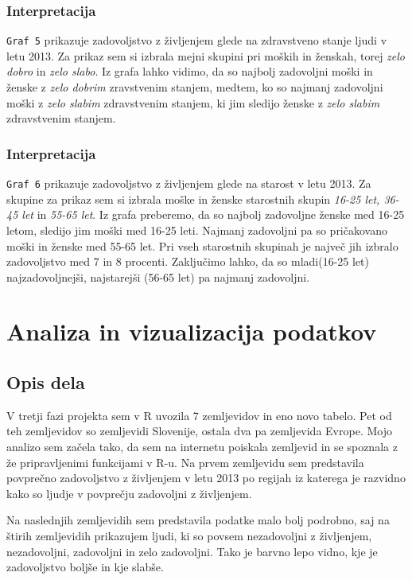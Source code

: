 \documentclass[11pt,a4paper]{article}
\begin{document}
\subsubsection{Interpretacija}
\verb+Graf 5+ prikazuje zadovoljstvo z življenjem glede na zdravstveno stanje ljudi v letu 2013. Za prikaz sem si izbrala mejni skupini pri moških in ženskah, torej \textit{zelo dobro} in \textit{zelo slabo}.  Iz grafa lahko vidimo, da so najbolj zadovoljni moški in ženske z \textit{zelo dobrim} zravstvenim stanjem, medtem, ko so najmanj zadovoljni moški z \textit{zelo slabim} zdravstvenim stanjem, ki jim sledijo ženske z \textit{zelo slabim} zdravstvenim stanjem.
\subsubsection{Interpretacija}
\verb+Graf 6+ prikazuje zadovoljstvo z življenjem glede na starost v letu 2013. Za skupine za prikaz sem si izbrala moške in ženske starostnih skupin \textit{16-25 let, 36-45 let} in \textit{55-65 let}. Iz grafa preberemo, da so najbolj zadovoljne ženske med 16-25 letom, sledijo jim moški med 16-25 leti. Najmanj zadovoljni pa so pričakovano moški in ženske med 55-65 let. Pri vseh starostnih skupinah je največ jih izbralo zadovoljstvo med 7 in 8 procenti. Zaključimo lahko, da so mladi(16-25 let) najzadovoljnejši, najstarejši (56-65 let) pa najmanj zadovoljni.
\section{Analiza in vizualizacija podatkov}
\subsection{Opis dela}
V tretji fazi projekta sem v R uvozila 7 zemljevidov in eno novo tabelo. Pet od teh zemljevidov so zemljevidi Slovenije, ostala dva pa zemljevida Evrope. Mojo analizo sem začela tako, da sem na internetu poiskala zemljevid in se spoznala z že pripravljenimi funkcijami v R-u. Na prvem zemljevidu sem predstavila povprečno zadovoljstvo z življenjem v letu 2013 po regijah iz katerega je razvidno kako so ljudje v povprečju zadovoljni z življenjem.

Na naslednjih zemljevidih sem predstavila podatke malo bolj podrobno, saj na štirih zemljevidih prikazujem ljudi, ki so povsem nezadovoljni z življenjem, nezadovoljni, zadovoljni in zelo zadovoljni. Tako je barvno lepo vidno, kje je zadovoljstvo boljše in kje slabše.
\end{document}
